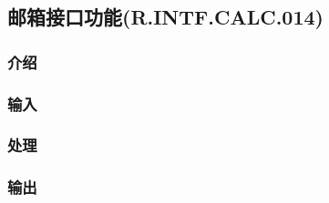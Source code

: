 \subsection{邮箱接口功能(R.INTF.CALC.014)}
\subsubsection{介绍}
\subsubsection{输入}
\subsubsection{处理}
\subsubsection{输出}